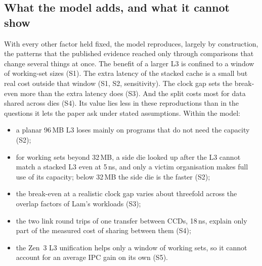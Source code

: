 \subsection{What the model adds, and what it cannot show}
\label{sec:sim-limits}
With every other factor held fixed, the model reproduces, largely by construction, the patterns that the published evidence reached only through comparisons that change several things at once. The benefit of a larger L3 is confined to a window of working-set sizes (S1). The extra latency of the stacked cache is a small but real cost outside that window (S1, S2, sensitivity). The clock gap sets the break-even more than the extra latency does (S3). And the split costs most for data shared across dies (S4). Its value lies less in these reproductions than in the questions it lets the paper ask under stated assumptions. Within the model:
\begin{itemize}
  \item a planar 96\,MB L3 loses mainly on programs that do not need the capacity (S2);
  \item for working sets beyond 32\,MB, a side die looked up after the L3 cannot match a stacked L3 even at 5\,ns, and only a victim organisation makes full use of its capacity; below 32\,MB the side die is the faster (S2);
  \item the break-even at a realistic clock gap varies about threefold across the overlap factors of Lam's workloads (S3);
  \item the two link round trips of one transfer between CCDs, 18\,ns, explain only part of the measured cost of sharing between them (S4);
  \item the Zen~3 L3 unification helps only a window of working sets, so it cannot account for an average IPC gain on its own (S5).
\end{itemize}

